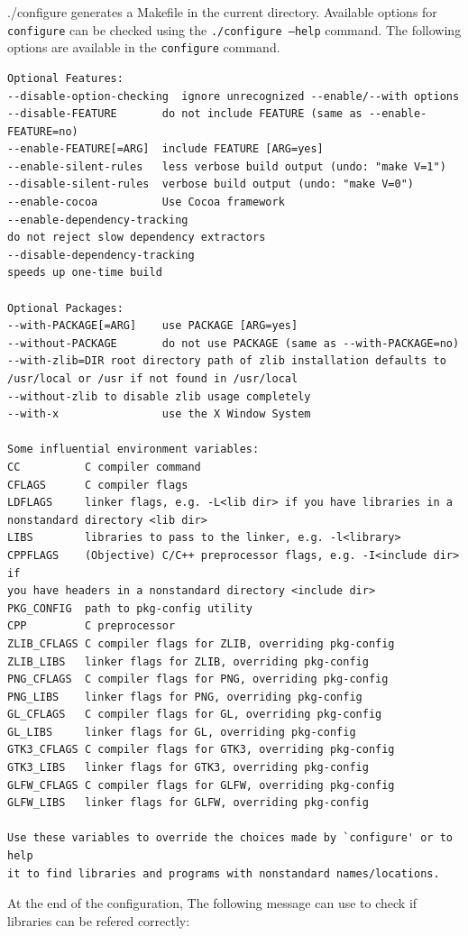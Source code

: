 {./configure} generates a Makefile in the current directory.  Available options for {\tt configure} can be checked using the {\tt ./configure --help} command. The following options are available in the {\tt configure} command.
%
{\small
\begin{verbatim}
Optional Features:
--disable-option-checking  ignore unrecognized --enable/--with options
--disable-FEATURE       do not include FEATURE (same as --enable-FEATURE=no)
--enable-FEATURE[=ARG]  include FEATURE [ARG=yes]
--enable-silent-rules   less verbose build output (undo: "make V=1")
--disable-silent-rules  verbose build output (undo: "make V=0")
--enable-cocoa          Use Cocoa framework
--enable-dependency-tracking
do not reject slow dependency extractors
--disable-dependency-tracking
speeds up one-time build

Optional Packages:
--with-PACKAGE[=ARG]    use PACKAGE [ARG=yes]
--without-PACKAGE       do not use PACKAGE (same as --with-PACKAGE=no)
--with-zlib=DIR root directory path of zlib installation defaults to
/usr/local or /usr if not found in /usr/local
--without-zlib to disable zlib usage completely
--with-x                use the X Window System

Some influential environment variables:
CC          C compiler command
CFLAGS      C compiler flags
LDFLAGS     linker flags, e.g. -L<lib dir> if you have libraries in a
nonstandard directory <lib dir>
LIBS        libraries to pass to the linker, e.g. -l<library>
CPPFLAGS    (Objective) C/C++ preprocessor flags, e.g. -I<include dir> if
you have headers in a nonstandard directory <include dir>
PKG_CONFIG  path to pkg-config utility
CPP         C preprocessor
ZLIB_CFLAGS C compiler flags for ZLIB, overriding pkg-config
ZLIB_LIBS   linker flags for ZLIB, overriding pkg-config
PNG_CFLAGS  C compiler flags for PNG, overriding pkg-config
PNG_LIBS    linker flags for PNG, overriding pkg-config
GL_CFLAGS   C compiler flags for GL, overriding pkg-config
GL_LIBS     linker flags for GL, overriding pkg-config
GTK3_CFLAGS C compiler flags for GTK3, overriding pkg-config
GTK3_LIBS   linker flags for GTK3, overriding pkg-config
GLFW_CFLAGS C compiler flags for GLFW, overriding pkg-config
GLFW_LIBS   linker flags for GLFW, overriding pkg-config

Use these variables to override the choices made by `configure' or to help
it to find libraries and programs with nonstandard names/locations.
\end{verbatim}
}

At the end of the configuration, The following message can use to check if libraries can be refered correctly:

